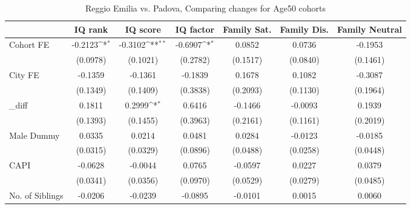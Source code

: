\begin{table}[htbp]\centering
\def\sym#1{\ifmmode^{#1}\else\(^{#1}\)\fi}
\caption{Reggio Emilia vs. Padova, Comparing changes for Age50 cohorts}
\begin{tabular}{l*{6}{c}}
\toprule
            &\multicolumn{1}{c}{IQ rank}&\multicolumn{1}{c}{IQ score}&\multicolumn{1}{c}{IQ factor}&\multicolumn{1}{c}{Family Sat.}&\multicolumn{1}{c}{Family Dis.}&\multicolumn{1}{c}{Family Neutral}\\
\midrule
Cohort FE   &     -0.2123\sym{*}  &     -0.3102\sym{**} &     -0.6907\sym{*}  &      0.0852         &      0.0736         &     -0.1953         \\
            &    (0.0978)         &    (0.1021)         &    (0.2782)         &    (0.1517)         &    (0.0840)         &    (0.1461)         \\
\addlinespace
City FE     &     -0.1359         &     -0.1361         &     -0.1839         &      0.1678         &      0.1082         &     -0.3087         \\
            &    (0.1349)         &    (0.1409)         &    (0.3838)         &    (0.2093)         &    (0.1130)         &    (0.1964)         \\
\addlinespace
\_diff       &      0.1811         &      0.2999\sym{*}  &      0.6416         &     -0.1466         &     -0.0093         &      0.1939         \\
            &    (0.1393)         &    (0.1455)         &    (0.3963)         &    (0.2161)         &    (0.1161)         &    (0.2019)         \\
\addlinespace
Male Dummy  &      0.0335         &      0.0214         &      0.0481         &      0.0284         &     -0.0123         &     -0.0185         \\
            &    (0.0315)         &    (0.0329)         &    (0.0896)         &    (0.0488)         &    (0.0258)         &    (0.0448)         \\
\addlinespace
CAPI        &     -0.0628         &     -0.0044         &      0.0765         &     -0.0597         &      0.0227         &      0.0379         \\
            &    (0.0341)         &    (0.0356)         &    (0.0970)         &    (0.0529)         &    (0.0279)         &    (0.0485)         \\
\addlinespace
No. of Siblings&     -0.0206         &     -0.0239         &     -0.0895         &     -0.0101         &      0.0015         &      0.0060         \\

\end{tabular}
\end{table}
